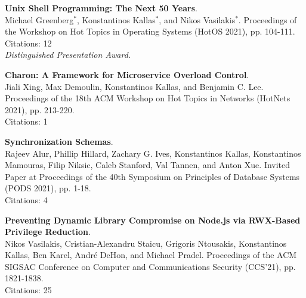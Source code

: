 \begin{minipage}{\textwidth}
\textbf{Unix Shell Programming: The Next 50 Years}. \\
Michael Greenberg$^*$, Konstantinos Kallas$^*$, and Nikos Vasilakis$^*$.
Proceedings of the Workshop on Hot Topics in Operating Systems (HotOS 2021), pp. 104-111. \\
Citations: 12 \\
\emph{Distinguished Presentation Award.}
\end{minipage}

\begin{minipage}{\textwidth}
\textbf{Charon: A Framework for Microservice Overload Control}. \\
Jiali Xing, Max Demoulin, Konstantinos Kallas, and Benjamin C. Lee.
Proceedings of the 18th ACM Workshop on Hot Topics in Networks (HotNets 2021), pp. 213-220. \\
Citations: 1
\end{minipage}

\begin{minipage}{\textwidth}
\textbf{Synchronization Schemas}. \\
Rajeev Alur, Phillip Hillard, Zachary G. Ives, Konstantinos Kallas, Konstantinos Mamouras, Filip Niksic, Caleb Stanford, Val Tannen, and Anton Xue.
Invited Paper at Proceedings of the 40th Symposium on Principles of Database Systems (PODS 2021), pp. 1-18. \\
Citations: 4
\end{minipage}



\begin{minipage}{\textwidth}
\textbf{Preventing Dynamic Library Compromise on Node.js via RWX-Based Privilege Reduction}. \\
Nikos Vasilakis, Cristian-Alexandru Staicu, Grigoris Ntousakis, Konstantinos Kallas, Ben Karel, André DeHon, and Michael Pradel.
Proceedings of the ACM SIGSAC Conference on Computer and Communications Security (CCS'21), pp. 1821-1838. \\
Citations: 25
\end{minipage}

